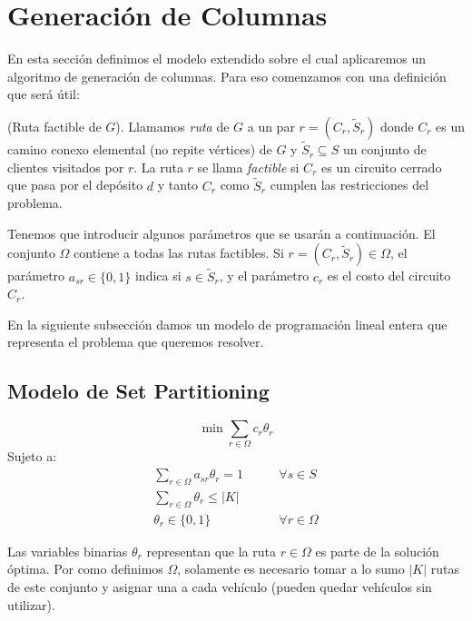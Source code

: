 \section{Generación de Columnas}

En esta sección definimos el modelo extendido sobre el cual aplicaremos un algoritmo de generación de columnas. Para eso comenzamos con una definición que será útil:

\begin{definition}
    (Ruta factible de $G$).
    Llamamos \emph{ruta} de $G$ a un par $r = (C_r, \tilde{S}_r)$ donde $C_r$ es un camino conexo elemental (no repite vértices) de $G$ y $\tilde{S}_r \subseteq S$ un conjunto de clientes visitados por $r$. La ruta $r$ se llama \emph{factible} si $C_r$ es un circuito cerrado que pasa por el depósito $d$ y tanto $C_r$ como $\tilde{S}_r$ cumplen las restricciones del problema.
\end{definition}

Tenemos que introducir algunos parámetros que se usarán a continuación. El conjunto $\Omega$ contiene a todas las rutas factibles. Si $r = (C_r, \tilde{S}_r) \in \Omega$, el parámetro $a_{sr} \in \{0, 1\}$ indica si $s \in \tilde{S}_r$, y el parámetro $c_r$ es el costo del circuito $C_r$. 

En la siguiente subsección damos un modelo de programación lineal entera que representa el problema que queremos resolver.

\subsection{Modelo de Set Partitioning}
\label{section:set-partitioning}

\begin{equation}
    \min \sum_{r \in \Omega} c_r  \theta_r
\end{equation}
Sujeto a:
\begin{align}
    \sum_{r \in \Omega} {a_{sr}\theta_r} = 1
\qquad & \forall {s \in S} \label{eq:master1} \\
\sum_{r \in \Omega}{\theta_r} \leq |K| & \label{eq:master2} \\
\theta_r \in \{0, 1\} \qquad & \forall{r \in \Omega}
\end{align}

Las variables binarias $\theta_r$ representan que la ruta $r \in \Omega$ es parte de la solución óptima. Por como definimos $\Omega$, solamente es necesario tomar a lo sumo $|K|$ rutas de este conjunto y asignar una a cada vehículo (pueden quedar vehículos sin utilizar). 

